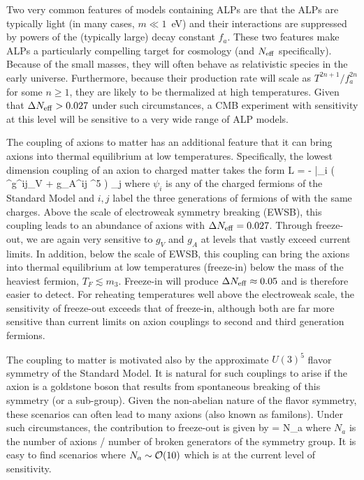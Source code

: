 Two very common features of models containing ALPs are that the ALPs are typically light (in many cases, $m \ll 1$~eV) and their interactions are suppressed by powers of the (typically large) decay constant $f_a$.  These two features make ALPs a particularly compelling target for cosmology (and $N_{\rm eff}$ specifically).  Because of the small masses, they will often behave as relativistic species in the early universe.  Furthermore, because their production rate will scale as $T^{2n +1} / f_a^{2n}$ for some $n \geq 1$, they are likely to be thermalized at high temperatures.  Given that $\Delta N_{\rm eff} > 0.027$ under such circumstances, a CMB experiment with sensitivity at this level will be sensitive to a very wide range of ALP models.

The coupling of axions to matter has an additional feature that it can bring axions into thermal equilibrium at low temperatures.  Specifically, the lowest dimension coupling of an axion to charged matter takes the form
\beq
{\cal L} = -  \bar \psi_i ( \gamma^\mu g^{ij}_V + g_A^{ij} \gamma^5 ) \psi_j
\eeq
where $\psi_{i}$ is any of the charged fermions of the Standard Model and $i,j$ label the three generations of fermions of with the same charges.  Above the scale of electroweak symmetry breaking (EWSB), this coupling leads to an abundance of axions with $\Delta N_{\rm eff} = 0.027$.  Through freeze-out, we are again very sensitive to $g_V$ and $g_A$ at levels that vastly exceed current limits.  In addition, below the scale of EWSB, this coupling can bring the axions into thermal equilibrium at low temperatures (freeze-in) below the mass of the heaviest fermion, $T_F \lesssim m_{3}$.  Freeze-in will produce $\Delta N_{\rm eff} \approx 0.05$ and is therefore easier to detect.  For reheating temperatures well above the electroweak scale, the sensitivity of freeze-out exceeds that of freeze-in, although both are far more sensitive than current limits on axion couplings to  second and third generation fermions.

The coupling to matter is motivated also by the approximate $U(3)^5$ flavor symmetry of the Standard Model.  It is natural for such couplings to arise if the axion is a goldstone boson that results from spontaneous breaking of this symmetry (or a sub-group).  Given the non-abelian nature of the flavor symmetry, these scenarios can often lead to many axions (also known as familons).  Under such circumstances, the contribution to freeze-out is given by 
\beq
\Delta \Neff = N_a 
\eeq
where $N_a$ is the number of axions / number of broken generators of the symmetry group.  It is easy to find scenarios where $N_a\sim {\cal O}(10)$ which is at the current level of sensitivity.


